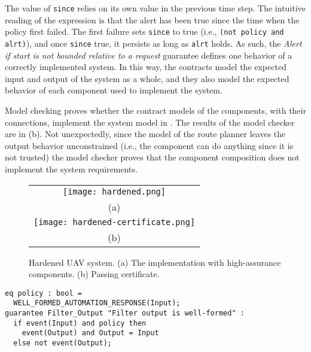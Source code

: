 The value of \texttt{since} relies on its own value in the previous time step. The intuitive reading of the expression is that the alert has been true since the time when the policy first failed. The first failure sets \texttt{since} to true (i.e., \texttt{(not policy and alrt)}), and once \texttt{since} true, it persists as long as \texttt{alrt} holds. As such, the \emph{Alert if start is not bounded relative to a request} guarantee defines one behavior of a correctly implemented system. In this way, the contracts model the expected input and output of the system as a whole, and they also model the expected behavior of each component used to implement the system.

Model checking proves whether the contract models of the components, with their connections, implement the system model in . The results of the model checker are in (b). Not unexpectedly, since the model of the route planner leaves the output behavior unconstrained (i.e., the component can do anything since it is not trusted) the model checker proves that the component composition does not implement the system requirements.

\begin{figure*}
  \begin{center}
    \begin{tabular}{c}
      \texttt{[image: hardened.png]} \\
      (a) \\
      \texttt{[image: hardened-certificate.png]} \\
      (b)
    \end{tabular}
  \end{center}
  \caption{Hardened UAV system. (a) The implementation with high-assurance components. (b) Passing certificate.}
  \label{fig:hardened}
\end{figure*}

\newsavebox{\flt}
\begin{lrbox}{\flt}
\begin{lstlisting}[style=agree]
eq policy : bool = 
  WELL_FORMED_AUTOMATION_RESPONSE(Input);       
guarantee Filter_Output "Filter output is well-formed" :
  if event(Input) and policy then 
    event(Output) and Output = Input
  else not event(Output);
\end{lstlisting}
\end{lrbox}

